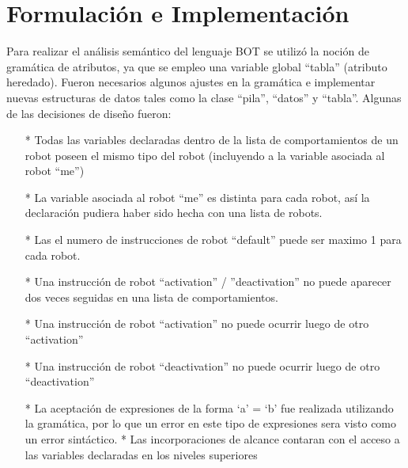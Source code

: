 \documentclass{article}
\begin{document}
		\section{Formulaci\'on e Implementaci\'on} 
Para realizar el an\'alisis sem\'antico del lenguaje BOT se utiliz\'o la noci\'on de gram\'atica de atributos, ya que se empleo una variable global “tabla” (atributo heredado). Fueron necesarios algunos ajustes en la gram\'atica e implementar nuevas estructuras de datos tales como la clase “pila”, “datos” y “tabla”. Algunas de las decisiones de diseño fueron:
\\
\begin{enumerate}
\item[*] Todas las variables declaradas dentro de la lista de comportamientos de un robot poseen el mismo tipo del robot (incluyendo a la variable asociada al robot “me”)
\item[*] La variable asociada al robot “me” es distinta para cada robot, así la declaraci\'on pudiera haber sido hecha con una lista de robots.
\item[*] Las el numero de instrucciones de robot “default” puede ser maximo 1 para cada robot.
\item[*] Una instrucci\'on de robot “activation” / ”deactivation” no puede aparecer dos veces seguidas en una lista de comportamientos.
\item[*] Una instrucci\'on de robot “activation” no puede ocurrir luego de otro “activation”
\item[*] Una instrucci\'on de robot “deactivation” no puede ocurrir luego de otro “deactivation”
\item[*] La aceptaci\'on de expresiones de la forma `a' = `b' fue realizada utilizando la gram\'atica, por lo que un error en este tipo de expresiones sera visto como un error sint\'actico.
* Las incorporaciones de alcance contaran con el acceso a las variables declaradas en los niveles superiores
\end{enumerate}
		\newpage
\end{document}
